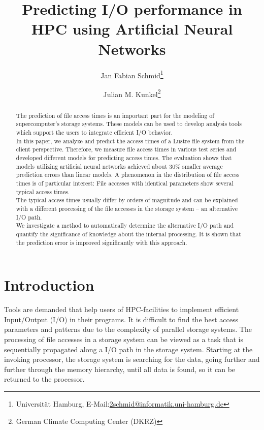 \documentclass{superfri}
\begin{document}
	
	\author{Jan Fabian Schmid\footnote{\label{susu}Universität Hamburg, E-Mail:\url{2schmid@informatik.uni-hamburg.de}} \and Julian M. Kunkel\footnote{German Climate Computing Center (DKRZ)}}
	
	\title{Predicting I/O performance in HPC using Artificial Neural Networks}
	
	\maketitle{}
	
	\begin{abstract}
		
		The prediction of file access times is an important part for the modeling of supercomputer's storage systems. 
		These models can be used to develop analysis tools which support the users to integrate efficient I/O behavior.\\
		In this paper, we analyze and predict the access times of a Lustre file system from the client perspective.
		Therefore, we measure file access times in various test series and developed different models for predicting access times. 
		The evaluation shows that models utilizing artificial neural networks achieved about 30\% smaller average prediction errors than linear models. 
		A phenomenon in the distribution of file access times is of particular interest:
		File accesses with identical parameters show several typical access times.\\
		The typical access times usually differ by orders of magnitude and can be explained with a different processing of the file accesses in the storage system -- an alternative I/O path.\\
		We investigate a method to automatically determine the alternative I/O path and quantify the significance of knowledge about the internal processing.
		It is shown that the prediction error is improved significantly with this approach.
		
	\end{abstract}
	
	\section*{Introduction}
	\label{sec:intro}
	
	Tools are demanded that help users of HPC-facilities to implement efficient Input/Output (I/O) in their programs.
	It is difficult to find the best access parameters and patterns due to the complexity of parallel storage systems.
	The processing of file accesses in a storage system can be viewed as a task that is sequentially propagated along a I/O path in the storage system.
	Starting at the invoking processor, the storage system is searching for the data, going further and further through the memory hierarchy, until all data is found, so it can be returned to the processor.
	
\end{document}
